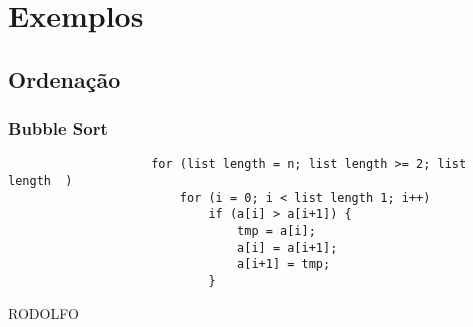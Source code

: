 
\section{Exemplos}
	\subsection{Ordenação}
		\subsubsection{Bubble Sort}
			\begin{frame}[fragile]
				\begin{verbatim}
					for (list length = n; list length >= 2; list length  ) 
						for (i = 0; i < list length 1; i++)
							if (a[i] > a[i+1]) { 
								tmp = a[i];
                     			a[i] = a[i+1];
								a[i+1] = tmp;
							}
				\end{verbatim}
\end{frame}

			\begin{frame}
				RODOLFO
			\end{frame}
